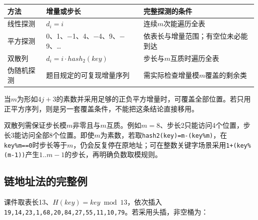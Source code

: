 \par\medskip\noindent\begin{minipage}{\linewidth}\fontsize{9.3}{12}\selectfont\begin{tabularx}{\linewidth}{@{}YYY@{}}
\toprule\noalign{}
\begin{minipage}[b]{\linewidth}\raggedright
方法
\end{minipage} & \begin{minipage}[b]{\linewidth}\raggedright
增量或步长
\end{minipage} & \begin{minipage}[b]{\linewidth}\raggedright
完整探测的条件
\end{minipage} \\
\midrule\noalign{}


线性探测 & \(d_i=i\) & 连续\(m\)次能遍历全表 \\
平方探测 & 0、1、\ensuremath{-}1、4、\ensuremath{-}4、9、\ensuremath{-}9、… & 依表长与增量范围；有空位未必能到达 \\
双散列 & \(d_i=i\cdot hash_2(key)\) & 步长与\(m\)互质时遍历全表 \\
伪随机探测 & 题目规定的可复现增量序列 & 需实际检查增量模\(m\)覆盖的剩余类 \\
\bottomrule\end{tabularx}
\end{minipage}\par\medskip

当\(m\)为形如\(4j+3\)的素数并采用足够的正负平方增量时，可覆盖全部位置。若只用正平方序列，则是另一套覆盖条件，不能把这条结论直接移用。

双散列需保证步长模\(m\)非零且与\(m\)互质。例如\(m=8\)、步长2只能访问4个位置，步长3能访问全部8个位置。即使\(m\)为素数，若取\texttt{hash2(\allowbreak{}key)\allowbreak{}=\allowbreak{}m-(\allowbreak{}key\%m)\allowbreak{}}，在\texttt{key\%m=\allowbreak{}=\allowbreak{}0}时步长等于\(m\)，仍会反复停在原地址；可在整数关键字场景采用\texttt{1+\allowbreak{}(\allowbreak{}key\%(\allowbreak{}m-1)\allowbreak{})\allowbreak{}}产生\(1..m-1\)的步长，再明确负数取模规则。

\subsection{链地址法的完整例}\label{DS07-hash-chain}

课件取表长13、\(H(key)=key\bmod13\)，依次插入\texttt{19,\allowbreak{}14,\allowbreak{}23,\allowbreak{}1,\allowbreak{}68,\allowbreak{}20,\allowbreak{}84,\allowbreak{}27,\allowbreak{}55,\allowbreak{}11,\allowbreak{}10,\allowbreak{}79}。若采用头插，非空桶为：

